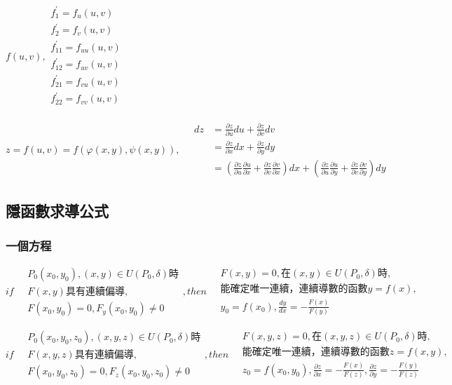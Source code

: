 \documentclass[UTF8]{ctexart}
\newcommand{\mt}[1]{\text{#1}}
\newcommand{\mf}[1]{\left( #1\right)}
\newcommand{\q}{\quad}
\newcommand{\qa}{\vspace{12 pt}}
\newcommand{\p}{\par}
\newcommand{\ma}[1]{\begin{array}{llll} #1 \end{array}}
\begin{document}
$f\mf{u,v},\ma{
    f_{1}^{'}=f_u\mf{u,v}\\
    f_{2}^{'}=f_v\mf{u,v}\\
    f_{11}^{'}=f_{uu}\mf{u,v}\\
    f_{12}^{'}=f_{uv}\mf{u,v}\\
    f_{21}^{'}=f_{vu}\mf{u,v}\\
    f_{22}^{'}=f_{vv}\mf{u,v}\\
}$\p

$z=f\mf{u,v}=f\mf{\varphi\mf{x,y},\psi\mf{x,y}} ,\q \ma{dz &=\frac{\partial z}{\partial u}du+\frac{\partial z}{\partial v}dv\\
    &=\frac{\partial z}{\partial x}dx+\frac{\partial z}{\partial y}dy\\
    &=\mf{\frac{\partial z}{\partial u}\frac{\partial u}{\partial x}+\frac{\partial z}{\partial v}\frac{\partial v}{\partial x}}dx+
    \mf{\frac{\partial z}{\partial u}\frac{\partial u}{\partial y}+\frac{\partial z}{\partial v}\frac{\partial v}{\partial y}}dy
}$


\subsection{隱函數求導公式}

\subsubsection{一個方程}
$if \q \ma{
    P_0\mf{x_0,y_0},\mf{x,y} \in U\mf{P_0,\delta}\mt{時}\\
    F\mf{x,y}\mt{具有連續偏導},\\
    F\mf{x_0,y_0}=0,F_y\mf{x_0,y_0}\neq 0
},then \q \ma{
    F\mf{x,y}=0,\mt{在} \mf{x,y} \in U\mf{P_0,\delta}\mt{時,}\\
    \mt{能確定唯一連續，連續導數的函數}y=f\mf{x},\\
    y_0=f\mf{x_0},\frac{dy}{dx}=-\frac{F\mf{x}}{F\mf{y}}
}$\p
\qa 

$if \q \ma{
    P_0\mf{x_0,y_0,z_0},\mf{x,y,z} \in U\mf{P_0,\delta}\mt{時}\\
    F\mf{x,y,z}\mt{具有連續偏導},\\
    F\mf{x_0,y_0,z_0}=0,F_z\mf{x_0,y_0,z_0}\neq 0
},then \q \ma{
    F\mf{x,y,z}=0,\mt{在} \mf{x,y,z} \in U\mf{P_0,\delta}\mt{時,}\\
    \mt{能確定唯一連續，連續導數的函數}z=f\mf{x,y},\\
    z_0=f\mf{x_0,y_0},\frac{\partial z}{\partial x}=-\frac{F\mf{x}}{F\mf{z}},\frac{\partial z}{\partial y}=-\frac{F\mf{y}}{F\mf{z}}
}$
\end{document}
